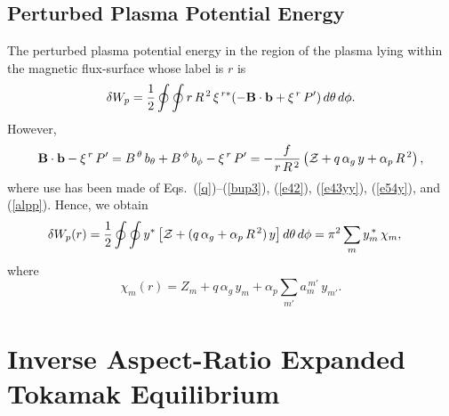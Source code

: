 \documentclass[12pt,prb,aps]{revtex4-1}
\begin{document}
\subsection{Perturbed Plasma Potential Energy}
The perturbed plasma potential energy in the region of the plasma lying within the magnetic flux-surface whose label is $r$ is\,\cite{tj1,gs1}
\begin{equation}
\delta W_p = \frac{1}{2}\oint\oint r\,R^{\,2}\,\xi^{\,r\ast}(-{\bf B}\cdot{\bf b} + \xi^{\,r}\,P')\,d\theta\,d\phi.
\end{equation}
However,
\begin{equation}
{\bf B}\cdot{\bf b} -\xi^{\,r}\,P' = B^{\,\theta}\,b_\theta+B^{\,\phi}\,b_\phi - \xi^{\,r}\,P'
= - \frac{f}{r\,R^{\,2}}\left({\cal Z} + q\,\alpha_g\,y + \alpha_p\,R^{\,2}\right),
\end{equation}
where use has been made of Eqs.~(\ref{q})--(\ref{bup3}), (\ref{e42}), (\ref{e43yy}), (\ref{e54y}),  and (\ref{alpp}). Hence,
we obtain
\begin{align}\label{e87j}
\delta W_p(r) &=\frac{1}{2}\oint\oint y^{\ast}\left[{\cal Z} + (q\,\alpha_g + \alpha_p\,R^{\,2})\,y\right]d\theta\,d\phi= \pi^2\sum_{m}y_m^{\,\ast}\,\chi_m,
\end{align}
where 
\begin{equation}\label{chidef}
\chi_m(r)=Z_m + q\,\alpha_g\,y_m + \alpha_p\sum_{m'} a_m^{\,m'}\,y_{m'}.
\end{equation}

\section{Inverse Aspect-Ratio Expanded Tokamak Equilibrium}\label{large}
\end{document}
